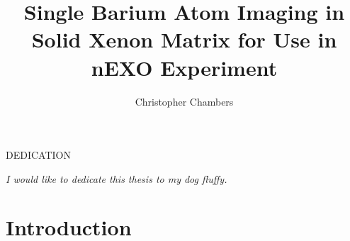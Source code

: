 \documentclass[doctor]{thesis} %
\title{Single Barium Atom Imaging in Solid Xenon Matrix for Use in nEXO Experiment}
\author{Christopher Chambers}
\begin{document}

\frontmatter %

\maketitle              %
\makemycopyright        %
\makeabstract           %
\makeacknowledgements   %

\begin{flatcenter} %

    DEDICATION

    \vfill %

    \noindent \textit{I would like to dedicate this thesis to my dog fluffy.}
    \vfill %
\end{flatcenter}
\newpage

\tableofcontents    %
\listoftables       %
\listoffigures      %

\mainmatter %

\chapter{Introduction}
\label{chap:intro}
\end{document}
